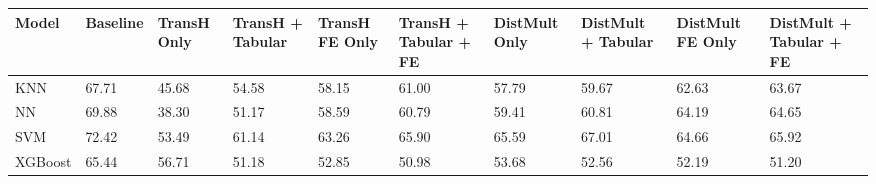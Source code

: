 \begin{tabular}{llllllllll}
\toprule
Model & Baseline & TransH Only & TransH + Tabular & TransH FE Only & TransH + Tabular + FE & DistMult Only & DistMult + Tabular & DistMult FE Only & DistMult + Tabular + FE \\
\midrule
KNN & 67.71 & 45.68 & 54.58 & 58.15 & 61.00 & 57.79 & 59.67 & 62.63 & 63.67 \\
NN & 69.88 & 38.30 & 51.17 & 58.59 & 60.79 & 59.41 & 60.81 & 64.19 & 64.65 \\
SVM & 72.42 & 53.49 & 61.14 & 63.26 & 65.90 & 65.59 & 67.01 & 64.66 & 65.92 \\
XGBoost & 65.44 & 56.71 & 51.18 & 52.85 & 50.98 & 53.68 & 52.56 & 52.19 & 51.20 \\
\bottomrule
\end{tabular}

